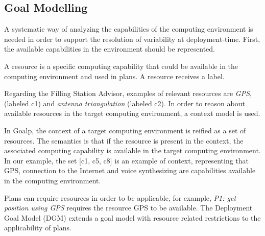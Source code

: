 \subsection{Goal Modelling}
\label{sec:dgm}

A systematic way of analyzing the capabilities of the computing environment is needed in order to support the resolution of variability at deployment-time. First, the available capabilities in the environment should be represented.

\begin{defn}[Resource]

  A resource is a specific computing capability that could be available in the computing environment and used in plans. A resource receives a label.

\end{defn}

Regarding the Filling Station Advisor, examples of relevant resources are \emph{GPS}, (labeled c1) and \emph{antenna triangulation} (labeled c2). In order to reason about available resources in the target computing environment, a context model is used.
%
%
%

In Goalp, the context of a target computing environment is reified as a set of resources.
The semantics is that if the resource is present in the context, the associated computing capability is available in the target computing environment.
In our example, the set [c1, c5, c8] is an example of context, representing that GPS, connection to the Internet and voice synthesizing are capabilities available in the computing environment.

Plans can require resources in order to be applicable, for example, \emph{P1: get position using GPS} requires the resource GPS to be available. The Deployment Goal Model (DGM) extends a goal model with resource related restrictions to the applicability of plans.

